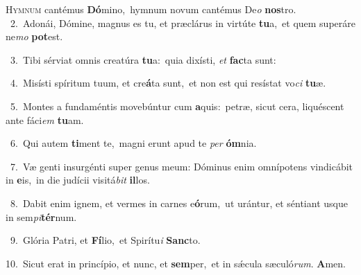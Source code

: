 \lettrine{\initial\textcolor{\initialcolor}{H}}{ymnum} cantémus \textbf{Dó}\-mino,~\star hymnum novum cantémus De\textit{o} \textbf{nos}\-tro.\\
{\numbfont\textcolor{\numbcolor}{~2.}}~Adonái, Dómine, magnus es tu, et præclárus in virtúte \textbf{tu}\-a,~\star et quem superáre ne\textit{mo} \textbf{pot}\-est.\par
{\numbfont\textcolor{\numbcolor}{~3.}}~Tibi sérviat omnis creatúra \textbf{tu}\-a:~\star quia dixísti, \textit{et} \textbf{fac}\-ta sunt:\par
{\numbfont\textcolor{\numbcolor}{~4.}}~Misísti spíritum tuum, et cre\-\textbf{á}\-ta sunt,~\star et non est qui resístat vo\textit{ci} \textbf{tu}\-æ.\par
{\numbfont\textcolor{\numbcolor}{~5.}}~Montes a fundaméntis movebúntur cum \textbf{a}\-quis:~\star petræ, sicut cera, liquéscent ante fáci\textit{em} \textbf{tu}\-am.\par
{\numbfont\textcolor{\numbcolor}{~6.}}~Qui autem \textbf{ti}\-ment te,~\star magni erunt apud te \textit{per} \textbf{óm}\-nia.\par
{\numbfont\textcolor{\numbcolor}{~7.}}~Væ genti insurgénti super genus meum: Dóminus enim omnípotens vindicábit in \textbf{e}\-is,~\star in die judícii visitá\textit{bit} \textbf{il}\-los.\par
{\numbfont\textcolor{\numbcolor}{~8.}}~Dabit enim ignem, et vermes in carnes e\-\textbf{ó}\-rum,~\star ut urántur, et séntiant usque in sem\-\textit{pi}\-\textbf{tér}num.\par
{\numbfont\textcolor{\numbcolor}{~9.}}~Glória Patri, et \textbf{Fí}\-lio,~\star et Spirítu\textit{i} \textbf{Sanc}\-to.\par
{\numbfont\textcolor{\numbcolor}{10.}}~Sicut erat in princípio, et nunc, et \textbf{sem}\-per,~\star et in sǽcula sæculó\-\textit{rum}\-. \textbf{A}\-men.\par
